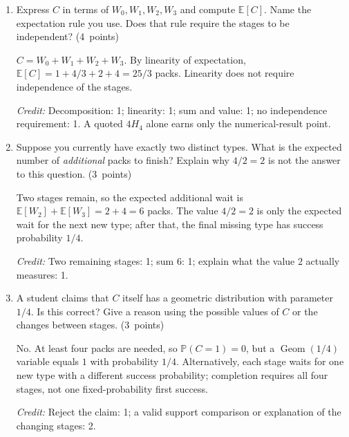 \documentclass[11pt,letterpaper]{article}
\newcommand{\Prob}{\mathbb P}
\newcommand{\E}{\mathbb E}
\newcommand{\partpts}[1]{\unskip\nobreak\hspace{.3em}%
  \mbox{\small\color{muted}(#1 points)}}
\newcommand{\credit}[1]{\par{\footnotesize\color{muted}\textit{Credit:} #1}}
\begin{document}
\begin{enumerate}
  \item Express $C$ in terms of $W_0,W_1,W_2,W_3$ and compute $\E[C]$.
  Name the expectation rule you use. Does that rule require the stages
  to be independent? \partpts{4}
  \begin{solution}[.6in]
    $C=W_0+W_1+W_2+W_3$. By linearity of expectation,
    $\E[C]=1+4/3+2+4=25/3$ packs.
    Linearity does not require independence of the stages.
    \credit{Decomposition: 1; linearity: 1; sum and value: 1;
    no independence requirement: 1. A quoted $4H_4$ alone earns
    only the numerical-result point.}
  \end{solution}

  \item Suppose you currently have exactly two distinct types.
  What is the expected number of \emph{additional} packs to finish?
  Explain why $4/2=2$ is not the answer to this question. \partpts{3}
  \begin{solution}[.55in]
    Two stages remain, so the expected additional wait is
    $\E[W_2]+\E[W_3]=2+4=6$ packs.
    The value $4/2=2$ is only the expected wait for the next new type;
    after that, the final missing type has success probability $1/4$.
    \credit{Two remaining stages: 1; sum $6$: 1;
    explain what the value $2$ actually measures: 1.}
  \end{solution}

  \item A student claims that $C$ itself has a geometric distribution
  with parameter $1/4$. Is this correct? Give a reason using the
  possible values of $C$ or the changes between stages. \partpts{3}
  \begin{solution}[.7in]
    No. At least four packs are needed, so $\Prob(C=1)=0$,
    but a $\operatorname{Geom}(1/4)$ variable equals $1$ with
    probability $1/4$. Alternatively, each stage waits for one
    new type with a different success probability; completion
    requires all four stages, not one fixed-probability first success.
    \credit{Reject the claim: 1; a valid support comparison or
    explanation of the changing stages: 2.}
  \end{solution}
\end{enumerate}

\label{quiz-last-page}
\end{document}
